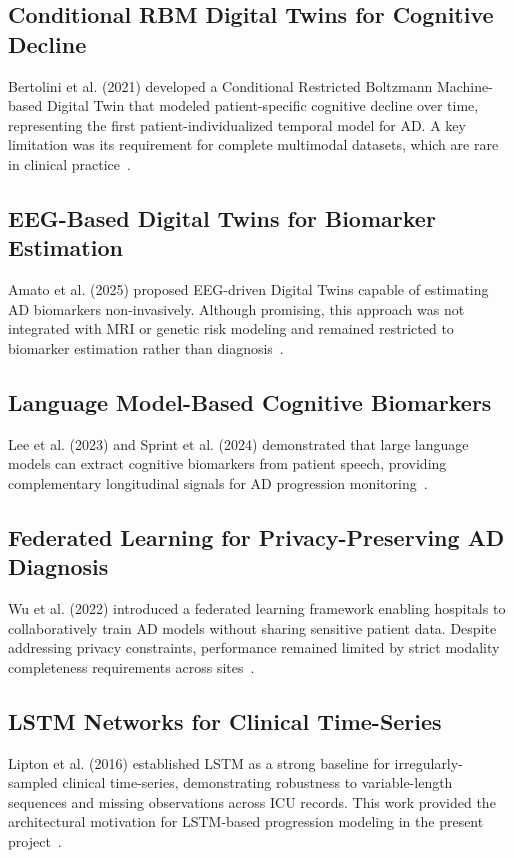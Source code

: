 \documentclass[12pt,singleside,a4paper]{article}
\begin{document}
\subsection{Conditional RBM Digital Twins for Cognitive Decline}
Bertolini et al. (2021) developed a Conditional Restricted Boltzmann Machine-based Digital Twin that modeled patient-specific cognitive decline over time, representing the first patient-individualized temporal model for AD. A key limitation was its requirement for complete multimodal datasets, which are rare in clinical practice~\cite{bertolini2021}.

\subsection{EEG-Based Digital Twins for Biomarker Estimation}
Amato et al. (2025) proposed EEG-driven Digital Twins capable of estimating AD biomarkers non-invasively. Although promising, this approach was not integrated with MRI or genetic risk modeling and remained restricted to biomarker estimation rather than diagnosis~\cite{amato2025}.

\subsection{Language Model-Based Cognitive Biomarkers}
Lee et al. (2023) and Sprint et al. (2024) demonstrated that large language models can extract cognitive biomarkers from patient speech, providing complementary longitudinal signals for AD progression monitoring~\cite{lee2023,sprint2024}.

\subsection{Federated Learning for Privacy-Preserving AD Diagnosis}
Wu et al. (2022) introduced a federated learning framework enabling hospitals to collaboratively train AD models without sharing sensitive patient data. Despite addressing privacy constraints, performance remained limited by strict modality completeness requirements across sites~\cite{wu2022}.

\subsection{LSTM Networks for Clinical Time-Series}
Lipton et al. (2016) established LSTM as a strong baseline for irregularly-sampled clinical time-series, demonstrating robustness to variable-length sequences and missing observations across ICU records. This work provided the architectural motivation for LSTM-based progression modeling in the present project~\cite{lipton2016}.
\end{document}
